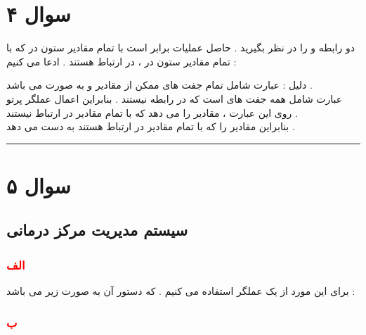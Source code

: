 \documentclass{article}
\begin{document}
\section*{سوال ۴ }
دو رابطه 
و 
را در نظر بگیرید . حاصل عملیات
برابر است با تمام مقادیر ستون 
در 
که با تمام مقادیر ستون 
در 
، در ارتباط هستند  . ادعا می کنیم  : 
\begin{center}
\end{center}
دلیل : عبارت 
شامل تمام جفت های ممکن از مقادیر 
و 
به صورت 
می باشد   . \\
عبارت 
شامل همه جفت های 
است که در رابطه 
نیستند . بنابراین اعمال عملگر پرتو 
روی این عبارت ، مقادیر 
را می دهد که با تمام مقادیر 
در ارتباط نیستند  . 
\\
بنابراین 
مقادیر 
را که با تمام مقادیر 
در ارتباط هستند به دست می دهد  . 
\hrule
\section*{سوال ۵}
\subsection*{سیستم مدیریت مرکز درمانی}
\subsubsection*{\textcolor{red}{الف}}
برای این مورد از یک عملگر 
استفاده می کنیم . که دستور آن به صورت زیر می باشد : 
\begin{center}
\end{center}
\subsubsection*{\textcolor{red}{ب}}
	\begin{center}
		\\
		\\
		\\
	\end{center}
\end{document}
